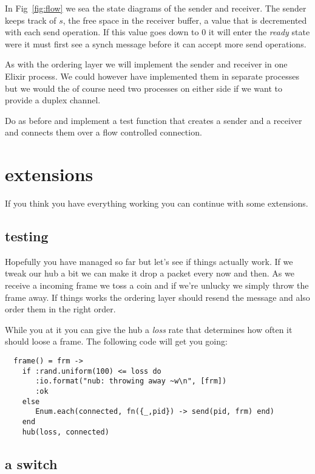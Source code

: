 \documentclass[a4paper,11pt]{article}
\begin{document}
In Fig~\ref{fig:flow} we sea the state diagrams of the sender and
receiver. The sender keeps track of $s$,
the free space in the receiver buffer, a value that is decremented
with each send operation. If this value goes down to $0$
it will enter the {\em ready} state were it must first see a synch
message before it can accept more send operations. 

As with the ordering layer we will implement the sender and receiver
in one Elixir process. We could however have implemented them in
separate processes but we would the of course need two processes on
either side if we want to provide a duplex channel. 

Do as before and implement a test function that creates a sender and a
receiver and connects them over a flow controlled connection.

\section{extensions }

If you think you have everything working you can continue with some
extensions.

\subsection{testing}

Hopefully you have managed so far but let's see if things actually
work. If we tweak our hub a bit we can make it drop a packet every now
and then. As we receive a incoming frame we toss a coin and if we're
unlucky we simply throw the frame away. If things works the ordering
layer should resend the message and also order them in the right
order.

While you at it you can give the hub a {\em loss} rate that
determines how often it should loose a frame. The following code will
get you going:

\begin{verbatim}
  frame() = frm ->
    if :rand.uniform(100) <= loss do
       :io.format("nub: throwing away ~w\n", [frm])
       :ok
    else
       Enum.each(connected, fn({_,pid}) -> send(pid, frm) end)
    end
    hub(loss, connected)
\end{verbatim}

\subsection{a switch}
\end{document}
